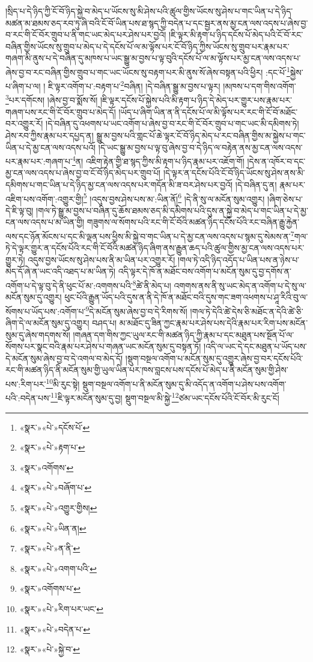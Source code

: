།སྲིད་པ་དེ་ཉིད་ཀྱི་ངོ་བོ་ཉིད་སྐྱེ་བ་མེད་པ་ཡོངས་སུ་མི་ཤེས་པའི་ཚུལ་གྱིས་ཡོངས་སུ་ཤེས་པ་གང་ཡིན་པ་དེ་ཉིད་མཚན་མ་ཐམས་ཅད་རབ་ཏུ་ཞི་བའི་ངོ་བོ་ཡིན་པས་ཐ་སྙད་ཀྱི་བདེན་པ་དང་སྦྱར་ནས་མྱ་ངན་ལས་འདས་པ་ཞེས་བྱ་བ་རང་གི་ངོ་བོར་གྲུབ་པ་ནི་གང་ཡང་མེད་པར་ཤེས་པར་བྱའོ། །ཇི་ལྟར་མི་རྟག་པ་ཉིད་དངོས་པོ་མེད་པའི་ངོ་བོ་རང་བཞིན་གྱིས་ཡོངས་སུ་གྲུབ་པ་མེད་པ་དེ་དངོས་པོ་ལ་མ་ལྟོས་པར་ངོ་བོ་ཉིད་ཀྱིས་ཡོངས་སུ་གྲུབ་པར་རྣམ་པར་གཞག་མི་ནུས་པ་དེ་བཞིན་དུ་མཁས་པ་ཡང་སྒྱུ་མ་བྱས་པ་ལྟ་བུའི་དངོས་པོ་ལ་མ་ལྟོས་པར་མྱ་ངན་ལས་འདས་པ་ཞེས་བྱ་བ་རང་བཞིན་གྱིས་གྲུབ་པ་གང་ཡང་ཡོངས་སུ་བརྟག་པར་མི་ནུས་སོ་ཞེས་བསྟན་པའི་ཕྱིར། :དང་པོ་\footnote{«སྣར་»«པེ་»དངོས་པོ་}སྐྱེས་པ་ཞིག་པ་ལ། །
ཇི་ལྟར་འགོག་པ་:བརྟག་པ་\footnote{«སྣར་»«པེ་»རྟག་པ་}བཞིན། །དེ་བཞིན་སྒྱུ་མ་བྱས་པ་ལྟར། །མཁས་པ་དག་གིས་འགོག་\footnote{«སྣར་»འགོགས་}པར་དགོངས། །ཞེས་བྱ་བ་སྨོས་སོ། །ཇི་ལྟར་དངོས་པོ་སྐྱེས་པའི་མི་རྟག་པ་ཉིད་དེ་མེད་པར་གྱུར་པས་རྣམ་པར་གཞག་པས་རང་གི་ངོ་བོར་གྲུབ་པ་མེད་དོ། །ཡོད་པ་ཞིག་ཡིན་ན་ནི་དངོས་པོ་ལ་མི་ལྟོས་པར་རང་གི་ངོ་བོ་མཐོང་བར་འགྱུར་རོ། །དེ་བཞིན་དུ་འཕགས་པ་ཡང་འགོག་པ་ཞེས་བྱ་བ་རང་གི་ངོ་བོར་གྲུབ་པ་གང་ཡང་མི་དམིགས་ཏེ། ཤེས་རབ་ཀྱིས་རྣམ་པར་དཔྱད་ན། སྒྱུ་མ་བྱས་པའི་གླང་པོ་ཆེ་ལྟར་ངོ་བོ་ཉིད་མེད་པ་རང་བཞིན་གྱིས་མ་སྐྱེས་པ་གང་ཡིན་པ་དེ་མྱ་ངན་ལས་འདས་པའོ། །དེ་ཡང་སྒྱུ་མ་བྱས་པ་ལྟ་བུ་ཞེས་བྱ་བ་དེ་ཉིད་ལ་བརྟེན་ནས་མྱ་ངན་ལས་འདས་པར་རྣམ་པར་:གཞག་པ་\footnote{«སྣར་»«པེ་»བཞོག་པ་}ན། འཇིག་རྟེན་གྱི་ཐ་སྙད་ཀྱིས་མི་རྟག་པ་ཉིད་རྣམ་པར་འཇོག་གོ། །དེས་ན་འཁོར་བ་དང་མྱ་ངན་ལས་འདས་པ་ཞེས་བྱ་བ་ངོ་བོ་ཉིད་མེད་པར་གྲུབ་པོ། །དེ་ལྟར་ན་དངོས་པོའི་ངོ་བོ་ཉིད་ཡོངས་སུ་ཤེས་ནས་མི་དམིགས་པ་གང་ཡིན་པ་དེ་ཉིད་མྱ་ངན་ལས་འདས་པར་གདོན་མི་ཟ་བར་ཤེས་པར་བྱའོ། །དེ་བཞིན་དུ་ན། རྣམ་པར་འཇིག་པས་འགོག་:འགྱུར་གྱི།\footnote{«སྣར་»«པེ་»འགྱུར་གྱིས།} །འདུས་བྱས་ཤེས་པས་མ་:ཡིན་ནོ།\footnote{«སྣར་»«པེ་»ཡིན་ན།} །དེ་ནི་སུ་ལ་མངོན་སུམ་འགྱུར། །ཞིག་ཅེས་པ་དེ་ཇི་ལྟ་བུ། །གལ་ཏེ་སྒྱུ་མ་བྱས་པ་བཞིན་དུ་ཆོས་ཐམས་ཅད་མི་དམིགས་པའི་དུས་ན་སྐྱེ་བ་མེད་པ་གང་ཡིན་པ་དེ་མྱ་ངན་ལས་འདས་པ་མ་ཡིན་གྱི། གཟུགས་ལ་སོགས་པའི་རང་གི་ངོ་བོའི་མཚན་ཉིད་དངོས་པོའི་རང་བཞིན་རྒྱུ་རྐྱེན་ལས་དང་ཉོན་མོངས་པ་དང་མི་ལྡན་པས་ཕྱིས་མི་སྐྱེ་བ་གང་ཡིན་པ་དེ་མྱ་ངན་ལས་འདས་པ་སྙམ་དུ་སེམས་ན་\footnote{«སྣར་»«པེ་»ན་ནི་}གལ་ཏེ་དེ་ལྟར་གྱུར་ན་དངོས་པོའི་རང་གི་ངོ་བོའི་མཚན་ཉིད་ཞིག་ནས་རྒྱུན་ཆད་པའི་ཚུལ་གྱིས་མྱ་ངན་ལས་འདས་པར་གྱུར་ཏེ། འདུས་བྱས་ཡོངས་སུ་ཤེས་པས་ནི་མ་ཡིན་པར་འགྱུར་རོ། །གལ་ཏེ་འདི་ཉིད་འདོད་པ་ཡིན་པས་ན་ཉེས་པ་མེད་དོ་ཞེ་ན་ཡང་འདི་འཐད་པ་མ་ཡིན་ཏེ། འདི་ལྟར་དེ་ཁོ་ན་མཐོང་བས་འགོག་པ་མངོན་སུམ་དུ་བྱ་དགོས་ན་འགོག་པ་དེ་ལྟ་བུ་དེ་ནི་ཕུང་པོ་མ་:འགགས་པའི་\footnote{«སྣར་»«པེ་»འགག་པའི་}ཚེ་ནི་མེད་པ། འགགས་ནས་ནི་སུ་ཡང་མེད་ན་འགོག་པ་དེ་སུ་ལ་མངོན་སུམ་དུ་འགྱུར། ཕུང་པོའི་རྒྱུན་ཡོད་པའི་དུས་ན་ནི་དེ་ཁོ་ན་མཐོང་བའི་དུས་གང་ཟག་འཕགས་པ་ཤཱ་རིའི་བུ་ལ་སོགས་པ་ཡོད་པས་:འགོག་པ་\footnote{«སྣར་»འགོགས་པ་}དེ་མངོན་སུམ་ཞེས་བྱ་བ་དེ་རིགས་སོ། །གལ་ཏེ་དེའི་ཚེ་དེས་ཅི་མཐོང་ན་དེའི་ཚེ་ཅི་ཞིག་དེ་ལ་མངོན་སུམ་དུ་འགྱུར། བཤད་པ། མ་མཐོང་དུ་ཟིན་ཀྱང་རྣམ་པར་ཤེས་པས་དེའི་རྣམ་པར་རིག་པས་མངོན་སུམ་དུ་ཞེས་གདགས་སོ། །གཞན་དག་གིས་ཀྱང་ཡུལ་རང་གི་མཚན་ཉིད་ཀྱི་རྣམ་པ་དང་མཐུན་པས་སྔོན་པོ་ལ་སོགས་པར་སྣང་བའི་རྣམ་པར་ཤེས་པ་གཞན་ཡང་མངོན་སུམ་དུ་བསྟན་ཏོ། །འདི་ལ་ཡང་དེ་དང་མཐུན་པ་ཡོད་པས་དེ་མངོན་སུམ་ཞེས་བྱ་བ་དེ་འགལ་བ་མེད་དོ། །སྡུག་བསྔལ་འགོག་པ་མངོན་སུམ་དུ་འགྱུར་ཞེས་བྱ་བར་དངོས་པོའི་རང་གི་མཚན་ཉིད་ནི་མངོན་སུམ་གྱི་ཡུལ་ཡིན་པར་ཁས་བླངས་པས་དངོས་པོ་མེད་པ་ནི་མངོན་སུམ་གྱི་ཤེས་པས་:རིག་པར་\footnote{«སྣར་»«པེ་»རིག་པར་ཡང་}མི་རུང་སྟེ། སྡུག་བསྔལ་འགོག་པ་ནི་མངོན་སུམ་དུ་མི་འདོད་ན་འགོག་པ་ཤེས་པས་འགོག་པའི་:བདེན་པས་\footnote{«སྣར་»«པེ་»བདེན་པ་}ཇི་ལྟར་མངོན་སུམ་དུ་བྱ། སྡུག་བསྔལ་མི་སྐྱེ་\footnote{«སྣར་»«པེ་»སྐྱེ་བ་}ཙམ་ཡང་དངོས་པོའི་ངོ་བོར་མི་རུང་ངོ། 